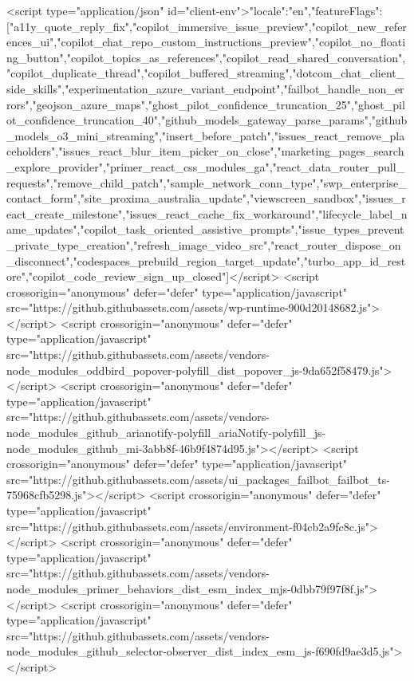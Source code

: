   <script type="application/json" id="client-env">{"locale":"en","featureFlags":["a11y_quote_reply_fix","copilot_immersive_issue_preview","copilot_new_references_ui","copilot_chat_repo_custom_instructions_preview","copilot_no_floating_button","copilot_topics_as_references","copilot_read_shared_conversation","copilot_duplicate_thread","copilot_buffered_streaming","dotcom_chat_client_side_skills","experimentation_azure_variant_endpoint","failbot_handle_non_errors","geojson_azure_maps","ghost_pilot_confidence_truncation_25","ghost_pilot_confidence_truncation_40","github_models_gateway_parse_params","github_models_o3_mini_streaming","insert_before_patch","issues_react_remove_placeholders","issues_react_blur_item_picker_on_close","marketing_pages_search_explore_provider","primer_react_css_modules_ga","react_data_router_pull_requests","remove_child_patch","sample_network_conn_type","swp_enterprise_contact_form","site_proxima_australia_update","viewscreen_sandbox","issues_react_create_milestone","issues_react_cache_fix_workaround","lifecycle_label_name_updates","copilot_task_oriented_assistive_prompts","issue_types_prevent_private_type_creation","refresh_image_video_src","react_router_dispose_on_disconnect","codespaces_prebuild_region_target_update","turbo_app_id_restore","copilot_code_review_sign_up_closed"]}</script>
<script crossorigin="anonymous" defer="defer" type="application/javascript" src="https://github.githubassets.com/assets/wp-runtime-900d20148682.js"></script>
<script crossorigin="anonymous" defer="defer" type="application/javascript" src="https://github.githubassets.com/assets/vendors-node_modules_oddbird_popover-polyfill_dist_popover_js-9da652f58479.js"></script>
<script crossorigin="anonymous" defer="defer" type="application/javascript" src="https://github.githubassets.com/assets/vendors-node_modules_github_arianotify-polyfill_ariaNotify-polyfill_js-node_modules_github_mi-3abb8f-46b9f4874d95.js"></script>
<script crossorigin="anonymous" defer="defer" type="application/javascript" src="https://github.githubassets.com/assets/ui_packages_failbot_failbot_ts-75968cfb5298.js"></script>
<script crossorigin="anonymous" defer="defer" type="application/javascript" src="https://github.githubassets.com/assets/environment-f04cb2a9fc8c.js"></script>
<script crossorigin="anonymous" defer="defer" type="application/javascript" src="https://github.githubassets.com/assets/vendors-node_modules_primer_behaviors_dist_esm_index_mjs-0dbb79f97f8f.js"></script>
<script crossorigin="anonymous" defer="defer" type="application/javascript" src="https://github.githubassets.com/assets/vendors-node_modules_github_selector-observer_dist_index_esm_js-f690fd9ae3d5.js"></script>
